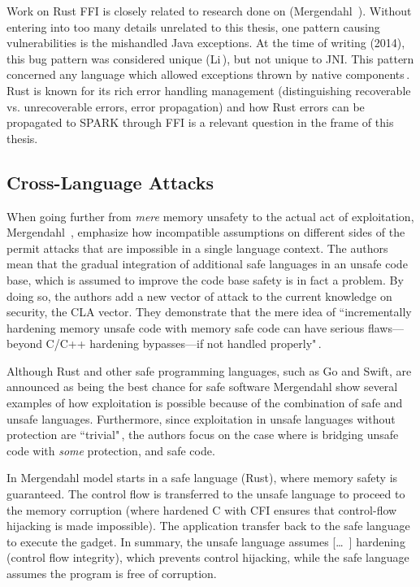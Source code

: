 \documentclass[nomenclature, english, bibtex]{kththesis}
\begin{document}
Work on Rust FFI is closely related to research done on  (Mergendahl \etal\,\cite{mergendahl_cross-language_2022}). Without entering into too many details unrelated to this thesis, one pattern causing vulnerabilities is the mishandled Java exceptions. At the time of writing (2014), this bug pattern was considered unique (Li\,\cite{li_improving_2014}), but not unique to JNI. This pattern concerned any language which allowed exceptions thrown by native components\,\cite{li_improving_2014}. Rust is known for its rich error handling management (distinguishing recoverable vs. unrecoverable errors, error propagation) and how Rust errors can be propagated to SPARK through FFI is a relevant question in the frame of this thesis. 
\subsection{Cross-Language Attacks}

When going further from \emph{mere} memory unsafety to the actual act of exploitation, Mergendahl \etal\,\cite{mergendahl_cross-language_2022}, emphasize how incompatible assumptions on different sides of the  permit attacks that are impossible in a single language context. The authors mean that the gradual integration of additional safe languages in an unsafe code base, which is assumed to improve the code base safety is in fact a problem. By doing so, the authors add a new vector of attack to the current knowledge on security, the \gls{CLA} vector. They demonstrate that the mere idea of ``incrementally hardening memory unsafe code with memory safe code can have serious flaws—beyond C/C++ hardening bypasses—if not handled properly"\,\cite{mergendahl_cross-language_2022}.

Although Rust and other safe programming languages, such as Go and Swift, are announced as being the best chance for safe software Mergendahl \etal show several examples of how exploitation is possible because of the combination of safe and unsafe languages. Furthermore, since exploitation in unsafe languages without protection are ``trivial"\,\cite{mergendahl_cross-language_2022}, the authors focus on the case where   is bridging unsafe code with \textit{some} protection, and safe code. 


In Mergendahl \etal model  starts in a safe language (Rust), where memory safety is guaranteed. The control flow is transferred to the unsafe language to proceed to the memory corruption (where hardened C with \gls{CFI} ensures that control-flow hijacking is made impossible). The application transfer back to the safe language to execute the gadget. In summary, the unsafe language assumes [\ldots\ ] hardening (control flow integrity), which prevents control hijacking, while the safe language assumes the program is free of corruption.
\end{document}
